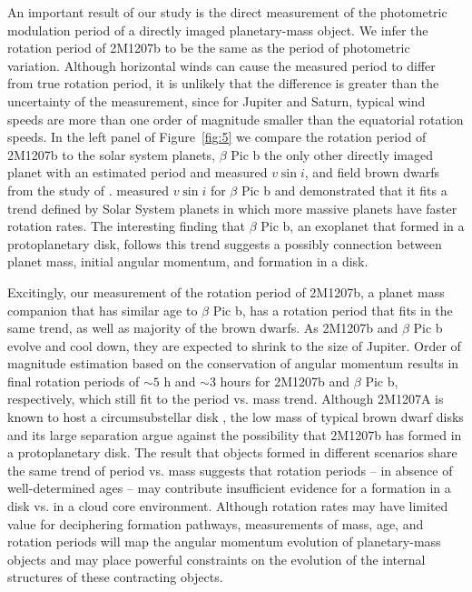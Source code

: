 \documentclass[apj]{emulateapj}
\newcommand{\bpic}{$\beta$ Pic}
\newcommand{\vsini}{$v\sin i$}
\begin{document}
An important result of our study is the direct measurement of the
photometric modulation period of a directly imaged planetary-mass
object. We infer the rotation period of 2M1207b to be the same as
the period of photometric variation. Although horizontal winds can cause the
measured period to differ from true rotation period, it is
unlikely that the difference is greater than the uncertainty of the
measurement, since for Jupiter and Saturn, typical wind speeds are
more than one order of magnitude smaller than the equatorial rotation speeds.
In the left panel of Figure~\ref{fig:5} we
compare the rotation period of 2M1207b to the solar system planets,
\bpic{} b the only other directly imaged planet with an estimated
period and measured \vsini, and field brown dwarfs from the study of
\cite[][]{Metchev2015}. \citet[][]{Snellen2014} measured \vsini{} for
\bpic{} b and demonstrated that it fits a trend defined by Solar
System planets in which more massive planets have faster rotation
rates. The interesting finding that \bpic{} b, an exoplanet that
formed in a protoplanetary disk, follows this trend suggests a
possibly connection between planet mass, initial angular momentum, and
formation in a disk.

Excitingly, our measurement of the rotation period of 2M1207b, a
planet mass companion that has similar age to \bpic{} b, has a
rotation period that fits in the same trend, as well as majority of
the brown dwarfs. As 2M1207b and \bpic{} b evolve and cool down, they are
expected to shrink to the size of Jupiter. Order of magnitude
estimation based on the conservation of angular momentum results in
final rotation periods of $\sim 5$ h and $\sim 3$ hours
\citep{Snellen2014} for 2M1207b and \bpic{} b, respectively, which
still fit to the period vs. mass trend. Although 2M1207A is known to
host a circumsubstellar disk \citep{Sterzik2004}, the low mass of
typical brown dwarf disks \citep[e.g.]{Klein2003, Mohanty2013} and its
large separation argue against the possibility that 2M1207b has formed
in a protoplanetary disk.  The result that objects formed in different
scenarios share the same trend of period vs. mass suggests that
rotation periods -- in absence of well-determined ages -- may
contribute insufficient evidence for a formation in a disk vs. in a
cloud core environment. Although rotation rates may have limited value
for deciphering formation pathways, measurements of mass, age, and
rotation periods will map the angular momentum evolution of
planetary-mass objects and may place powerful constraints on the
evolution of the internal structures of these contracting objects.
\end{document}
